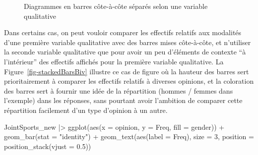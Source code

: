 \documentclass[
  letterpaper,
]{book}
\newenvironment{Shaded}{\begin{snugshade}}{\end{snugshade}}
\newcommand{\AttributeTok}[1]{\textcolor[rgb]{0.40,0.45,0.13}{#1}}
\newcommand{\DecValTok}[1]{\textcolor[rgb]{0.68,0.00,0.00}{#1}}
\newcommand{\FloatTok}[1]{\textcolor[rgb]{0.68,0.00,0.00}{#1}}
\newcommand{\FunctionTok}[1]{\textcolor[rgb]{0.28,0.35,0.67}{#1}}
\newcommand{\NormalTok}[1]{\textcolor[rgb]{0.00,0.23,0.31}{#1}}
\newcommand{\SpecialCharTok}[1]{\textcolor[rgb]{0.37,0.37,0.37}{#1}}
\newcommand{\StringTok}[1]{\textcolor[rgb]{0.13,0.47,0.30}{#1}}
\begin{document}
\begin{figure}[H]


\caption{\label{fig-groupedBarsUpgraded}Diagrammes en barres côte-à-côte
séparés selon une variable qualitative}

\end{figure}%

Dans certains cas, on peut vouloir comparer les effectifs relatifs aux
modalités d'une première variable qualitative avec des barres mises
côte-à-côte, et n'utiliser la seconde variable qualitative que pour
avoir un peu d'éléments de contexte ``à l'intérieur'' des effectifs
affichés pour la première variable qualitative. La
Figure~\ref{fig-stackedBarsBiv} illustre ce cas de figure où la hauteur
des barres sert prioritairement à comparer les effectifs relatifs à
diverses opinions, et la coloration des barres sert à fournir une idée
de la répartition (hommes / femmes dans l'exemple) dans les réponses,
sans pourtant avoir l'ambition de comparer cette répartition facilement
d'un type d'opinion à un autre.

\begin{Shaded}
\begin{Highlighting}[]
\NormalTok{JointSports\_new }\SpecialCharTok{|\textgreater{}}
  \FunctionTok{ggplot}\NormalTok{(}\FunctionTok{aes}\NormalTok{(}\AttributeTok{x =}\NormalTok{ opinion, }\AttributeTok{y =}\NormalTok{ Freq, }\AttributeTok{fill =}\NormalTok{ gender)) }\SpecialCharTok{+}
  \FunctionTok{geom\_bar}\NormalTok{(}\AttributeTok{stat =} \StringTok{"identity"}\NormalTok{) }\SpecialCharTok{+}
  \FunctionTok{geom\_text}\NormalTok{(}\FunctionTok{aes}\NormalTok{(}\AttributeTok{label =}\NormalTok{ Freq), }\AttributeTok{size =} \DecValTok{3}\NormalTok{, }\AttributeTok{position =} \FunctionTok{position\_stack}\NormalTok{(}\AttributeTok{vjust =} \FloatTok{0.5}\NormalTok{))}
\end{Highlighting}
\end{Shaded}
\end{document}
